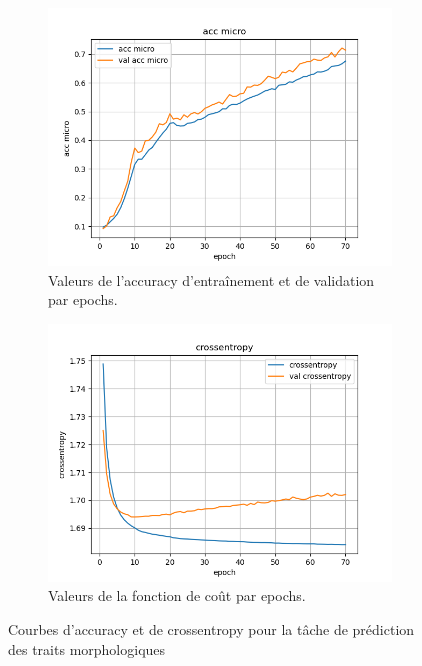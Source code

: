 \documentclass[a4paper]{article}
\begin{document}
\begin{figure}[H]
    \centering
    \begin{subfigure}{0.45\textwidth}
        \centering
        \includegraphics[width=\linewidth]{../logs/get_morphy_separate_French_1/acc_micro.png}
        \caption{Valeurs de l'accuracy d'entraînement et de validation par epochs.}
    \end{subfigure}
    \hfill
    \begin{subfigure}{0.45\textwidth}
        \centering
        \includegraphics[width=\linewidth]{../logs/get_morphy_separate_French_1/crossentropy.png}
        \caption{Valeurs de la fonction de coût par epochs.}
    \end{subfigure}
    \caption{Courbes d'accuracy et de crossentropy pour la tâche de prédiction des traits morphologiques}
\end{figure}
\end{document}
